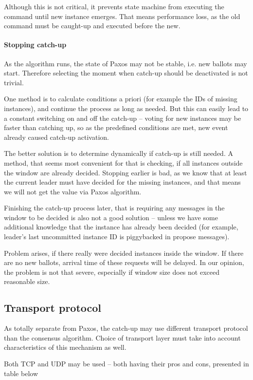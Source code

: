 Although this is not critical, it prevents state machine from executing the command until new instance emerges. That means performance loss, as the old command must be caught-up and executed before the new.

\paragraph*{Stopping catch-up} As the algorithm runs, the state of Paxos may not be stable, i.e. new ballots may start. Therefore selecting the moment when catch-up should be deactivated is not trivial.

One method is to calculate conditions a priori (for example the IDs of missing instances), and continue the process as long as needed. But this can easily lead to a constant switching on and off the catch-up -- voting for new instances may be faster than catching up, so as the predefined conditions are met, new event already caused catch-up activation.

The better solution is to determine dynamically if catch-up is still needed. A method, that seems most convenient for that is checking, if all instances outside the window are already decided. Stopping earlier is bad, as we know that at least the current leader must have decided for the missing instances, and that means we will not get the value via Paxos algorithm.

Finishing the catch-up process later, that is requiring any messages in the window to be decided is also not a good solution -- unless we have some additional knowledge that the instance has already been decided (for example, leader's last uncommitted instance ID is piggybacked in propose messages).

Problem arises, if there really were decided instances inside the window. If there are no new ballots, arrival time of these requests will be delayed. In our opinion, the problem is not that severe, especially if window size does not exceed reasonable size.

\subsection{Transport protocol}
\label{subsec:transport_protocole}
As totally separate from Paxos, the catch-up may use different transport protocol than the consensus algorithm.
Choice of transport layer must take into account characteristics of this mechanism as well.

Both TCP and UDP may be used -- both having their pros and cons, presented in table below

